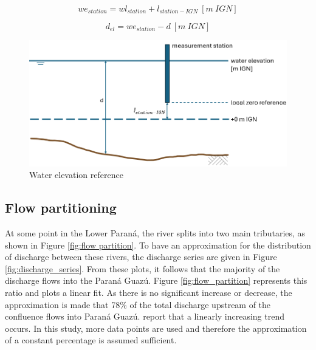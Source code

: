 \begin{equation}
    we_{station} = wl_{station} + l_{station-IGN} ~[m~IGN]
\end{equation}

\begin{equation}
    d_{el} = we_{station}-d ~[m~IGN]
\end{equation}


\begin{figure}[H]
    \centering
    \includegraphics[width=0.75\linewidth]{figures/ch5/waterelevations.png}
    \caption{Water elevation reference}
    \label{fig:waterelevationreference}
\end{figure}

\subsection{Flow partitioning}

At some point in the Lower Paraná, the river splits into two main tributaries, as shown in Figure \ref{fig:flow partition}. To have an approximation for the distribution of discharge between these rivers, the discharge series are given in Figure \ref{fig:discharge_series}. From these plots, it follows that the majority of the discharge flows into the Paraná Guazú. Figure \ref{fig:flow_partition} represents this ratio and plots a linear fit. As there is no significant increase or decrease, the approximation is made that 78\% of the total discharge upstream of the confluence flows into Paraná Guazú. \citeauthor{reMetodologiaParaGeneracion2009} report that a linearly increasing trend occurs. In this study, more data points are used and therefore the approximation of a constant percentage is assumed sufficient. 

